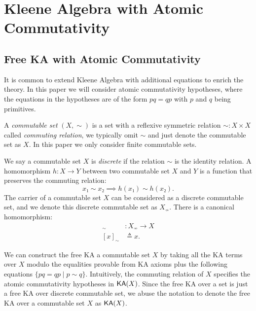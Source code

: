 \chapter{Kleene Algebra with Atomic Commutativity}
\label{chapter:body}
\thispagestyle{myheadings}

\graphicspath{{2_Commutativity/Figures/}}

\section{Free KA with Atomic Commutativity}

It is common to extend Kleene Algebra with additional equations 
to enrich the theory\cite{DBLP:conf/fossacs/DoumaneKPP19, Kozen_Mamouras_2014, Pous_Rot_Wagemaker_2022}.
In this paper we will consider atomic commutativity hypotheses,
where the equations in the hypotheses are of the form \(p q = q p\)
with \(p\) and \(q\) being primitives.

A \emph{commutable set} \((X, ∼)\) is a set with a reflexive symmetric relation \(∼: X × X\)
called \emph{commuting relation},
we typically omit \(∼\) and just denote the commutable set as \(X\).
In this paper we only consider finite commutable sets.

We say a commutable set \(X\) is \emph{discrete} if the relation \(∼\) is the identity relation.
A homomorphism \(h: X → Y\) between two commutable set \(X\) and \(Y\)
is a function that preserves the commuting relation:
\[x₁ ∼ x₂ ⟹ h(x₁) ∼ h(x₂).\]
The carrier of a commutable set \(X\) can be considered as a discrete commutable set,
and we denote this discrete commutable set as \(X_≁\).
There is a canonical homomorphism:
\begin{align*}
  [-]_∼ & : X_≁ → X \\  
  [x]_∼ & ≜ x.
\end{align*}

We can construct the free KA a commutable set \(X\) by 
taking all the KA terms over \(X\) modulo the equalities provable from KA axioms plus
the following equations \(\{p q = q p ∣ p ∼ q\}\).
Intuitively, the commuting relation of \(X\) specifies 
the atomic commutativity hypotheses in \(\mathsf{KA}(X)\).
Since the free KA over a set is just a free KA over discrete commutable set,
we abuse the notation to denote the free KA over a commutable set \(X\) as \(\mathsf{KA}(X)\).

